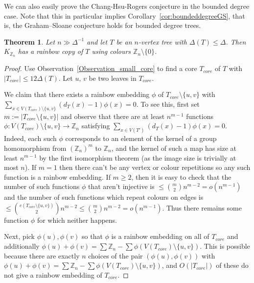 \documentclass[a4paper,11pt,hidelinks]{amsart}
\newtheorem{theorem}{Theorem}[section]
\theoremstyle{definition}
\begin{document}
We can also easily prove the Chang-Hsu-Rogers conjecture \cite{chang1981additive} in the bounded degree case. Note that this in particular implies Corollary~\ref{cor:boundeddegreeGS}, that is, the Graham--Sloane conjecture holds for bounded degree trees.
\begin{theorem}\label{thm:chang}
Let $n\gg \Delta^{-1}$  and let $T$ be an $n$-vertex tree with $\Delta(T)\le \Delta$. Then $K_{\mathbb{Z}_n}$ has a rainbow copy of $T$ using colours $\mathbb{Z}_n\setminus\{0\}$.
\end{theorem}
\begin{proof}
 Use Observation~\ref{Observation_small_core} to find a core $T_{core}$ of $T$ with $|T_{core}|\le 12\Delta (T)$.  Let $u$, $v$ be two leaves in $T_{core}$. 

 We claim that there exists a rainbow embedding $\phi$ of $T_{core}\setminus \{u,v\}$ with $\sum_{x\in V(T_{core})\setminus \{u,v\}} (d_T(x)-1)\phi(x)=0$. To see this, first set $m:=|T_{core}\setminus \{u,v\}|$ and  observe that there are at least $n^{m-1}$ functions $\phi:V(T_{core})\setminus \{u,v\}\to \mathbb{Z}_n$ satisfying $\sum_{x\in V(T')} (d_T(x)-1)\phi(x)=0$.  Indeed, each such $\phi$ corresponds to an element of the kernel of a group homomorphism from $(\mathbb{Z}_n)^m$ to $\mathbb{Z}_n$, and the kernel of such a map has size at least $n^{m-1}$ by the first isomorphism theorem (as the image size is trivially at most $n$). If $m=1$ then there can't be any vertex or colour repetitions so any such function is a rainbow embedding. If $m\geq 2$,  then it is easy to check that the number of such functions $\phi$ that aren't injective is $\le \binom m2 n^{m-2}=o(n^{m-1})$ and the number of such functions which repeat colours on edges is $\le \binom {e(T_{core}\setminus \{u,v\})}{2}n^{m-2}\le \binom m2 n^{m-2}=o(n^{m-1})$. Thus there remains some function $\phi$ for which neither happens. 

\par Next, pick $\phi(u), \phi(v)$ so that $\phi$ is a rainbow embedding on all of $T_{core}$ and additionally $\phi(u)+\phi(v)=\sum \mathbb{Z}_n- \sum \phi(V(T_{core})\setminus\{u,v\})$. This is possible because there are exactly $n$ choices of the pair $(\phi(u), \phi(v))$ with  $\phi(u)+\phi(v)=\sum \mathbb{Z}_n- \sum \phi(V(T_{core})\setminus\{u,v\})$, and  $O(|T_{core}|)$ of these do not give a rainbow embedding of $T_{core}$. 


\end{proof}
\end{document}
